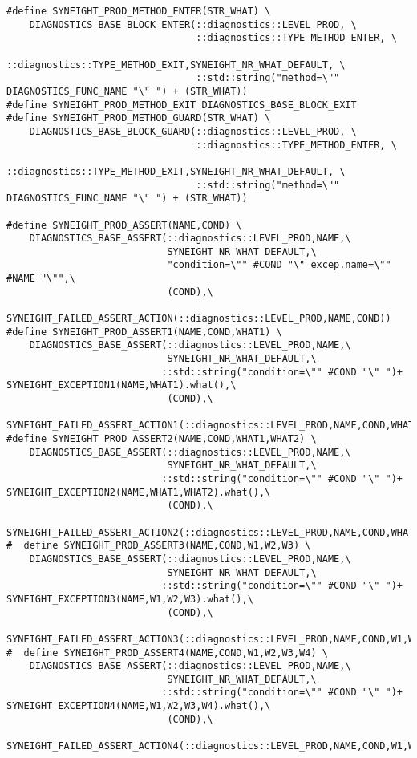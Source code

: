 \begin{verbatim}
#define SYNEIGHT_PROD_METHOD_ENTER(STR_WHAT) \
    DIAGNOSTICS_BASE_BLOCK_ENTER(::diagnostics::LEVEL_PROD, \
                                 ::diagnostics::TYPE_METHOD_ENTER, \
                                 ::diagnostics::TYPE_METHOD_EXIT,SYNEIGHT_NR_WHAT_DEFAULT, \
                                 ::std::string("method=\"" DIAGNOSTICS_FUNC_NAME "\" ") + (STR_WHAT))
#define SYNEIGHT_PROD_METHOD_EXIT DIAGNOSTICS_BASE_BLOCK_EXIT
#define SYNEIGHT_PROD_METHOD_GUARD(STR_WHAT) \
    DIAGNOSTICS_BASE_BLOCK_GUARD(::diagnostics::LEVEL_PROD, \
                                 ::diagnostics::TYPE_METHOD_ENTER, \
                                 ::diagnostics::TYPE_METHOD_EXIT,SYNEIGHT_NR_WHAT_DEFAULT, \
                                 ::std::string("method=\"" DIAGNOSTICS_FUNC_NAME "\" ") + (STR_WHAT))

#define SYNEIGHT_PROD_ASSERT(NAME,COND) \
    DIAGNOSTICS_BASE_ASSERT(::diagnostics::LEVEL_PROD,NAME,\
                            SYNEIGHT_NR_WHAT_DEFAULT,\
                            "condition=\"" #COND "\" excep.name=\"" #NAME "\"",\
                            (COND),\
                            SYNEIGHT_FAILED_ASSERT_ACTION(::diagnostics::LEVEL_PROD,NAME,COND))
#define SYNEIGHT_PROD_ASSERT1(NAME,COND,WHAT1) \
    DIAGNOSTICS_BASE_ASSERT(::diagnostics::LEVEL_PROD,NAME,\
                            SYNEIGHT_NR_WHAT_DEFAULT,\
                           ::std::string("condition=\"" #COND "\" ")+ SYNEIGHT_EXCEPTION1(NAME,WHAT1).what(),\
                            (COND),\
                            SYNEIGHT_FAILED_ASSERT_ACTION1(::diagnostics::LEVEL_PROD,NAME,COND,WHAT1))
#define SYNEIGHT_PROD_ASSERT2(NAME,COND,WHAT1,WHAT2) \
    DIAGNOSTICS_BASE_ASSERT(::diagnostics::LEVEL_PROD,NAME,\
                            SYNEIGHT_NR_WHAT_DEFAULT,\
                           ::std::string("condition=\"" #COND "\" ")+ SYNEIGHT_EXCEPTION2(NAME,WHAT1,WHAT2).what(),\
                            (COND),\
                            SYNEIGHT_FAILED_ASSERT_ACTION2(::diagnostics::LEVEL_PROD,NAME,COND,WHAT1,WHAT2))
#  define SYNEIGHT_PROD_ASSERT3(NAME,COND,W1,W2,W3) \
    DIAGNOSTICS_BASE_ASSERT(::diagnostics::LEVEL_PROD,NAME,\
                            SYNEIGHT_NR_WHAT_DEFAULT,\
                           ::std::string("condition=\"" #COND "\" ")+ SYNEIGHT_EXCEPTION3(NAME,W1,W2,W3).what(),\
                            (COND),\
                            SYNEIGHT_FAILED_ASSERT_ACTION3(::diagnostics::LEVEL_PROD,NAME,COND,W1,W2,W3))
#  define SYNEIGHT_PROD_ASSERT4(NAME,COND,W1,W2,W3,W4) \
    DIAGNOSTICS_BASE_ASSERT(::diagnostics::LEVEL_PROD,NAME,\
                            SYNEIGHT_NR_WHAT_DEFAULT,\
                           ::std::string("condition=\"" #COND "\" ")+ SYNEIGHT_EXCEPTION4(NAME,W1,W2,W3,W4).what(),\
                            (COND),\
                            SYNEIGHT_FAILED_ASSERT_ACTION4(::diagnostics::LEVEL_PROD,NAME,COND,W1,W2,W3,W4))



\end{verbatim}
